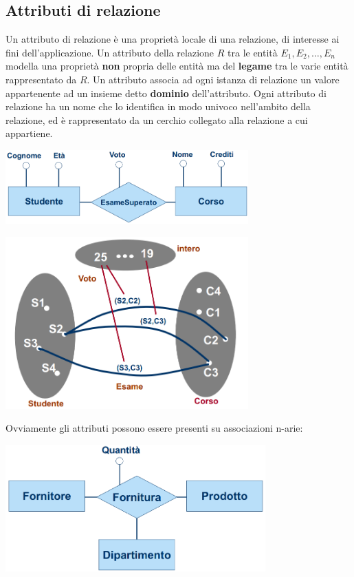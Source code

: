 \documentclass[12pt]{article}
\begin{document}
\subsection{Attributi di relazione}
Un attributo di relazione è una proprietà locale di una relazione, di interesse ai fini dell'applicazione.
Un attributo della relazione $R$ tra le entità $E_1, E_2, \dots, E_n$ modella una proprietà \textbf{non} propria delle entità
ma del \textbf{legame} tra le varie entità rappresentato da $R$.
Un attributo associa ad ogni istanza di relazione un valore appartenente ad un insieme detto \textbf{dominio} dell'attributo.
Ogni attributo di relazione ha un nome che lo identifica in modo univoco nell'ambito della relazione, ed è rappresentato da un cerchio collegato alla relazione a cui appartiene.
\begin{center}
    \includegraphics[width = 0.70\textwidth]{Images/25.PNG}
\end{center}
\begin{center}
    \includegraphics[width = 0.70\textwidth]{Images/26.PNG}
\end{center}
Ovviamente gli attributi possono essere presenti su associazioni n-arie:
\begin{center}
    \includegraphics[width = 0.75\textwidth]{Images/27.PNG}
\end{center}
\end{document}
